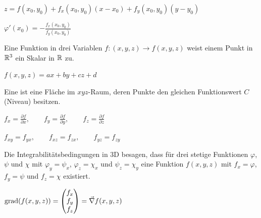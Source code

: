 \begin{formulabox}
    $\displaystyle z = f(x_0,y_0) + f_x(x_0,y_0)(x-x_0) + f_y(x_0,y_0)(y-y_0)$
\end{formulabox}

\begin{formulabox}
    $\displaystyle \varphi'(x_0) = -\frac{f_x(x_0,y_0)}{f_y(x_0,y_0)}$
\end{formulabox}

\ZSFNewColumn
{}
Eine Funktion in drei Variablen $f:(x,y,z)\to f(x,y,z)$ weist einem Punkt in $\mathbb{R}^3$ ein Skalar in $\mathbb{R}$ zu.
\begin{formulabox}
    $\displaystyle f(x,y,z)=ax+by+cz+d$
\end{formulabox}

Eine  ist eine Fläche im $xyz$-Raum, deren Punkte den gleichen Funktionswert $C$ (Niveau) besitzen.

\begin{formulabox}
    $\displaystyle f_x=\frac{\partial f}{\partial x},\qquad f_y=\frac{\partial f}{\partial y},\qquad f_z=\frac{\partial f}{\partial z}$
\end{formulabox}

\begin{formulabox}
    $\displaystyle f_{xy}=f_{yx},\qquad f_{xz}=f_{zx},\qquad f_{yz}=f_{zy}$
\end{formulabox}

Die Integrabilitätsbedingungen in 3D besagen, dass für drei stetige Funktionen $\varphi$, $\psi$ und $\chi$ mit $\varphi_y=\psi_x$, $\varphi_z=\chi_x$ und $\psi_z=\chi_y$ eine Funktion $f(x,y,z)$ mit $f_x=\varphi$, $f_y=\psi$ und $f_z=\chi$ existiert.

\begin{formulabox}
    $\displaystyle \operatorname{grad}(f(x,y,z))=\begin{pmatrix} f_x \\ f_y \\ f_z \end{pmatrix}=\vec{\nabla}f(x,y,z)$
\end{formulabox}

